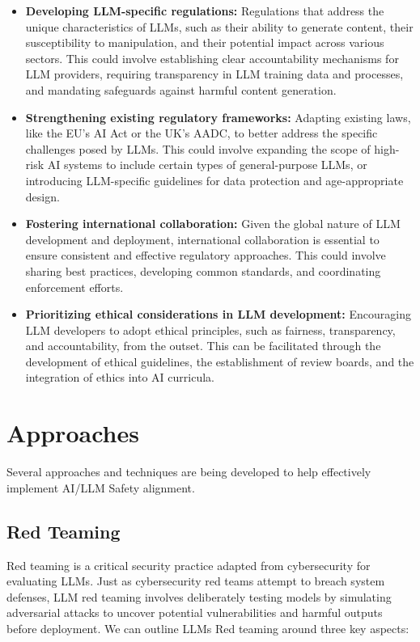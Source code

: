 \begin{itemize}
    \item \textbf{Developing LLM-specific regulations:} Regulations that address the unique characteristics of LLMs, such as their ability to generate content, their susceptibility to manipulation, and their potential impact across various sectors. This could involve establishing clear accountability mechanisms for LLM providers, requiring transparency in LLM training data and processes, and mandating safeguards against harmful content generation.
    
    \item \textbf{Strengthening existing regulatory frameworks:} Adapting existing laws, like the EU's AI Act or the UK's AADC, to better address the specific challenges posed by LLMs. This could involve expanding the scope of high-risk AI systems to include certain types of general-purpose LLMs, or introducing LLM-specific guidelines for data protection and age-appropriate design.
    
    \item \textbf{Fostering international collaboration:} Given the global nature of LLM development and deployment, international collaboration is essential to ensure consistent and effective regulatory approaches. This could involve sharing best practices, developing common standards, and coordinating enforcement efforts.
    
    \item \textbf{Prioritizing ethical considerations in LLM development:} Encouraging LLM developers to adopt ethical principles, such as fairness, transparency, and accountability, from the outset. This can be facilitated through the development of ethical guidelines, the establishment of review boards, and the integration of ethics into AI curricula.
\end{itemize}

\section{Approaches}

Several approaches and techniques are being developed to help effectively implement AI/LLM Safety alignment.

\subsection{Red Teaming}

Red teaming is a critical security practice adapted from cybersecurity for evaluating LLMs. Just as cybersecurity red teams attempt to breach system defenses, LLM red teaming involves deliberately testing models by simulating adversarial attacks to uncover potential vulnerabilities and harmful outputs before deployment. We can outline LLMs Red teaming around three key aspects:

